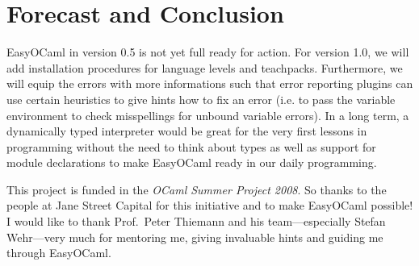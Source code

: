 
\section{Forecast and Conclusion}

EasyOCaml in version 0.5 is not yet full ready for action. For version 
1.0, we will add installation procedures for language levels and 
teachpacks.
Furthermore, we will equip the errors with more informations 
such that error reporting plugins can use certain heuristics to give 
hints how to fix an error (i.e. to pass the variable environment to check
misspellings for unbound variable errors).
In a long term, a dynamically typed interpreter would be great for the very
first lessons in programming without the need to think about types as well as
support for module declarations to make EasyOCaml ready in our daily
programming.


This project is funded in the \emph{OCaml Summer Project 2008}.
So thanks to the people at Jane Street Capital for this initiative and to
make EasyOCaml possible!
I would like to thank Prof.\ Peter Thiemann and his team---especially Stefan
Wehr---very much for mentoring me, giving invaluable hints and guiding me
through EasyOCaml.

